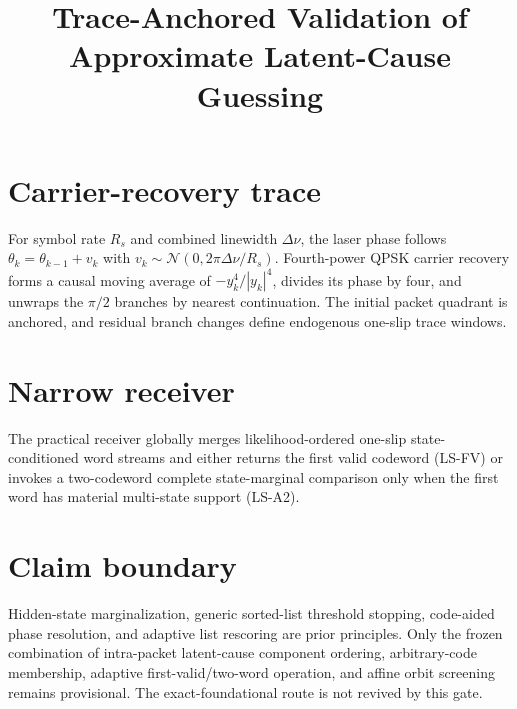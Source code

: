 \documentclass[11pt]{article}
\title{Trace-Anchored Validation of Approximate Latent-Cause Guessing}
\author{}
\date{}
\begin{document}
\maketitle
\section{Carrier-recovery trace}
For symbol rate $R_s$ and combined linewidth $\Delta\nu$, the laser phase
follows $\theta_k=\theta_{k-1}+v_k$ with
$v_k\sim\mathcal N(0,2\pi\Delta\nu/R_s)$.  Fourth-power QPSK carrier recovery
forms a causal moving average of $-y_k^4/|y_k|^4$, divides its phase by four,
and unwraps the $\pi/2$ branches by nearest continuation.  The initial packet
quadrant is anchored, and residual branch changes define endogenous one-slip
trace windows.
\section{Narrow receiver}
The practical receiver globally merges likelihood-ordered one-slip
state-conditioned word streams and either returns the first valid codeword
(LS-FV) or invokes a two-codeword complete state-marginal comparison only when
the first word has material multi-state support (LS-A2).
\section{Claim boundary}
Hidden-state marginalization, generic sorted-list threshold stopping,
code-aided phase resolution, and adaptive list rescoring are prior principles.
Only the frozen combination of intra-packet latent-cause component ordering,
arbitrary-code membership, adaptive first-valid/two-word operation, and affine
orbit screening remains provisional.  The exact-foundational route is not
revived by this gate.
\end{document}
